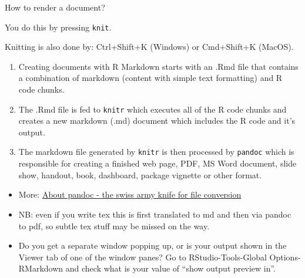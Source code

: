 \documentclass[10pt,ignorenonframetext,]{beamer}
\begin{document}
\begin{frame}[fragile]

\begin{block}{How to render a document?}

\vspace{2mm}

You do this by pressing \texttt{knit}.

Knitting is also done by: Ctrl+Shift+K (Windows) or Cmd+Shift+K (MacOS).

\vspace{2mm}

\begin{enumerate}
[1)]
\item
  Creating documents with R Markdown starts with an .Rmd file that
  contains a combination of markdown (content with simple text
  formatting) and R code chunks.
\item
  The .Rmd file is fed to \texttt{knitr} which executes all of the R
  code chunks and creates a new markdown (.md) document which includes
  the R code and it's output.
\item
  The markdown file generated by \texttt{knitr} is then processed by
  \texttt{pandoc} which is responsible for creating a finished web page,
  PDF, MS Word document, slide show, handout, book, dashboard, package
  vignette or other format.
\end{enumerate}

\end{block}

\end{frame}

\begin{frame}

\begin{itemize}
\item
  More: \href{https://pandoc.org/}{About pandoc - the swiss army knife
  for file conversion}
\item
  NB: even if you write tex this is first translated to md and then via
  pandoc to pdf, so subtle tex stuff may be missed on the way.
\item
  Do you get a separate window popping up, or is your output shown in
  the Viewer tab of one of the window panes? Go to RStudio-Tools-Global
  Options-RMarkdown and check what is your value of ``show output
  preview in''.
\end{itemize}

\end{frame}
\end{document}
